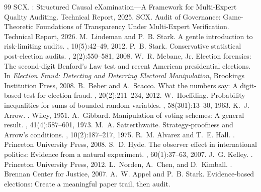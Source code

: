 \documentclass[11pt,a4paper]{article}
\theoremstyle{definition}
\begin{document}
\begin{thebibliography}{99}
SCX.
: Structured Causal eXamination---A Framework for Multi-Expert Quality Auditing.
\newblock Technical Report, 2025.
SCX.
 Audit of Governance: Game-Theoretic Foundations of Transparency Under Multi-Expert Verification.
\newblock Technical Report, 2026.
M.~Lindeman and P.~B. Stark.
\newblock A gentle introduction to risk-limiting audits.
, 10(5):42--49, 2012.
P.~B. Stark.
\newblock Conservative statistical post-election audits.
, 2(2):550--581, 2008.
W.~R. Mebane, Jr.
\newblock Election forensics: The second-digit Benford's Law test and recent American presidential elections.
\newblock In {\em Election Fraud: Detecting and Deterring Electoral Manipulation}, Brookings Institution Press, 2008.
B.~Beber and A.~Scacco.
\newblock What the numbers say: A digit-based test for election fraud.
, 20(2):211--234, 2012.
W.~Hoeffding.
\newblock Probability inequalities for sums of bounded random variables.
, 58(301):13--30, 1963.
K.~J. Arrow.
.
\newblock Wiley, 1951.
A.~Gibbard.
\newblock Manipulation of voting schemes: A general result.
, 41(4):587--601, 1973.
M.~A. Satterthwaite.
\newblock Strategy-proofness and Arrow's conditions.
, 10(2):187--217, 1975.
R.~M. Alvarez and T.~E. Hall.
.
\newblock Princeton University Press, 2008.
S.~D. Hyde.
\newblock The observer effect in international politics: Evidence from a natural experiment.
, 60(1):37--63, 2007.
J.~G. Kelley.
.
\newblock Princeton University Press, 2012.
L.~Norden, A.~Chen, and D.~Kimball.
.
\newblock Brennan Center for Justice, 2007.
A.~W. Appel and P.~B. Stark.
\newblock Evidence-based elections: Create a meaningful paper trail, then audit.

\end{thebibliography}
\end{document}

